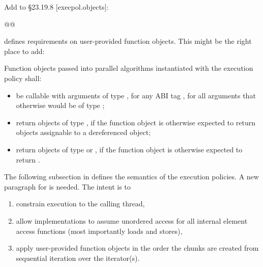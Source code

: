 Add to §23.19.8 [execpol.objects]:
\begin{itemdecl}
@@
\end{itemdecl}

\citep[§28.4.2]{N4659} defines requirements on user-provided function objects.
This might be the right place to add:
\begin{wgText}
  \addtocounter{Paras}{1}
  \color{WgAdd}
  \pnum Function objects passed into parallel algorithms instantiated with the \simdEP execution policy shall:
  \begin{itemize}
    \item be callable with arguments of type , for any ABI tag , for all arguments that otherwise would be of type ;
    \item return objects of type , if the function object is otherwise expected to return objects assignable to a dereferenced  object;
    \item return objects of type  or \bool, if the function object is otherwise expected to return \bool.
  \end{itemize}
\end{wgText}

The following subsection in \citep[§28.4.3]{N4659} defines the semantics of the execution policies.
A new paragraph for \simdEP is needed.
The intent is to
\begin{enumerate}
  \item constrain execution to the calling thread,
  \item allow implementations to assume unordered access for all internal element access functions (most importantly loads and stores),
  \item apply user-provided function objects in the order the \simd chunks are created from sequential iteration over the iterator(s).
\end{enumerate}
\begin{wgText}
  \addtocounter{Paras}{7}%
  \wgAdd{
  \pnum
  The invocations of element access functions in parallel algorithms invoked with an execution policy object of type \simdEPT are permitted to execute in an unordered fashion in the calling thread, except for the application of user-provided function objects.
  User-provided function objects are called with an im\-ple\-men\-ta\-tion-defined number of sequence elements combined into a \simd[<T, Abi>] object.
  The type for \type{Abi} is chosen by the implementation.
  It may be different for subsequent applications of the user-provided function in the same parallel algorithm invocation.
  The type for \type T is the decayed type of the sequence elements.
  The order of elements in the \simd object is equal to the order of the corresponding elements in the sequence argument.
  The invocation order of user-provided function objects is sequential.
}
\end{wgText}

